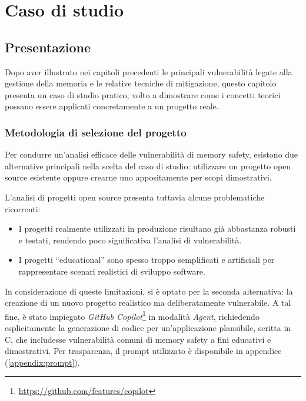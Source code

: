 \chapter{Caso di studio}
\label{cha:real_case}

\section{Presentazione}
\label{sec:presentation}

Dopo aver illustrato nei capitoli precedenti le principali vulnerabilità legate alla
gestione della memoria e le relative tecniche di mitigazione, questo capitolo
presenta un caso di studio pratico, volto a dimostrare come i concetti teorici possano
essere applicati concretamente a un progetto reale.

\subsection*{Metodologia di selezione del progetto}

Per condurre un'analisi efficace delle vulnerabilità di memory safety, esistono due
alternative principali nella scelta del caso di studio: utilizzare un progetto
open source esistente oppure crearne uno appositamente per scopi dimostrativi.

L'analisi di progetti open source presenta tuttavia alcune problematiche
ricorrenti:
\begin{itemize}
  \item I progetti realmente utilizzati in produzione risultano già abbastanza robusti
    e testati, rendendo poco significativa l'analisi di vulnerabilità.

  \item I progetti ``educational'' sono spesso troppo semplificati e artificiali
    per rappresentare scenari realistici di sviluppo software.
\end{itemize}

In considerazione di queste limitazioni, si è optato per la seconda alternativa:
la creazione di un nuovo progetto realistico ma deliberatamente vulnerabile. A tal
fine, è stato impiegato \textit{GitHub Copilot}\footnote{\url{https://github.com/features/copilot}}
in modalità \textit{Agent}, richiedendo esplicitamente la generazione di codice
per un'applicazione plausibile, scritta in C, che includesse vulnerabilità
comuni di memory safety a fini educativi e dimostrativi. Per trasparenza, il
prompt utilizzato è disponibile in appendice (\autoref{appendix:prompt}).

